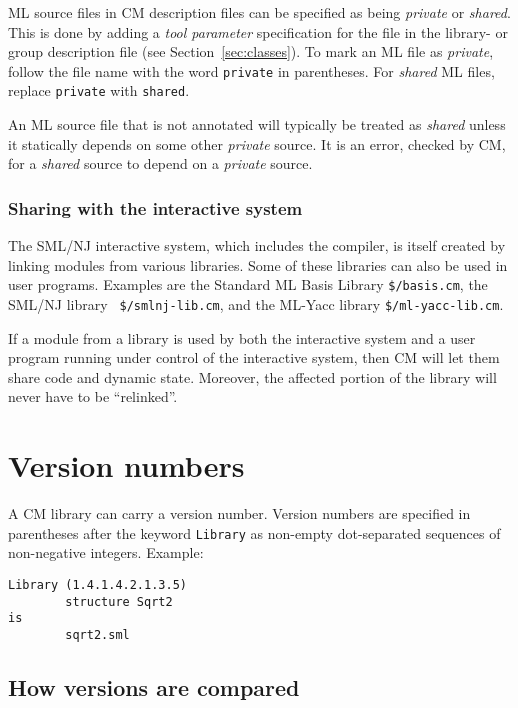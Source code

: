 \documentclass[titlepage,letterpaper]{article}
\begin{document}
ML source files in CM description files can be specified as being {\em
private} or {\em shared}.  This is done by adding a {\em tool
parameter} specification for the file in the library- or group
description file (see Section~\ref{sec:classes}). To mark an ML file
as {\em private}, follow the file name with the word {\tt private} in
parentheses.  For {\em shared} ML files, replace {\tt private} with
{\tt shared}.

An ML source file that is not annotated will typically be treated as
{\em shared} unless it statically depends on some other {\em private}
source.  It is an error, checked by CM, for a {\em shared} source to
depend on a {\em private} source.

\subsubsection*{Sharing with the interactive system}

The SML/NJ interactive system, which includes the compiler, is itself
created by linking modules from various libraries. Some of these
libraries can also be used in user programs.  Examples are the
Standard ML Basis Library {\tt \$/basis.cm}, the SML/NJ library {\tt
\$/smlnj-lib.cm}, and the ML-Yacc library {\tt \$/ml-yacc-lib.cm}.

If a module from a library is used by both the interactive system and
a user program running under control of the interactive system, then
CM will let them share code and dynamic state.  Moreover, the affected
portion of the library will never have to be ``relinked''.

\section{Version numbers}
\label{sec:versions}

A CM library can carry a version number.  Version numbers are
specified in parentheses after the keyword {\tt Library} as non-empty
dot-separated sequences of non-negative integers.  Example:

\begin{verbatim}
Library (1.4.1.4.2.1.3.5)
        structure Sqrt2
is
        sqrt2.sml
\end{verbatim}

\subsection{How versions are compared}
\end{document}
